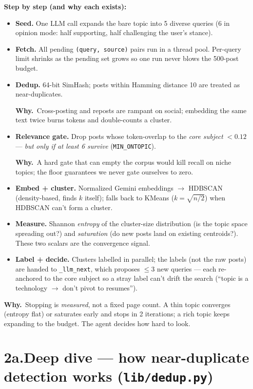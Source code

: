 \documentclass[11pt,a4paper]{article}
\newcommand{\why}[1]{%
  \par\vspace{2pt}%
  \noindent\colorbox{mist}{\begin{minipage}{\dimexpr\linewidth-2\fboxsep}%
  \textcolor{accent2}{\textbf{Why.}}~#1\end{minipage}}\par\vspace{3pt}}
\newcommand{\code}[1]{\texttt{\small #1}}
\begin{document}
\noindent\textbf{Step by step (and why each exists):}
\begin{itemize}
\item \textbf{Seed.} One LLM call expands the bare topic into 5 diverse queries
(6 in opinion mode: half supporting, half challenging the user's stance).
\item \textbf{Fetch.} All pending \code{(query, source)} pairs run in a thread
pool. Per-query limit shrinks as the pending set grows so one run never blows
the 500-post budget.
\item \textbf{Dedup.} 64-bit SimHash; posts within Hamming distance 10 are
treated as near-duplicates. \why{Cross-posting and reposts are rampant on
social; embedding the same text twice burns tokens and double-counts a cluster.}
\item \textbf{Relevance gate.} Drop posts whose token-overlap to the
\emph{core subject} $<0.12$ --- \emph{but only if at least 6 survive}
(\code{MIN\_ONTOPIC}). \why{A hard gate that can empty the corpus would kill
recall on niche topics; the floor guarantees we never gate ourselves to zero.}
\item \textbf{Embed + cluster.} Normalized Gemini embeddings $\rightarrow$
HDBSCAN (density-based, finds $k$ itself); falls back to KMeans
($k=\sqrt{n/2}$) when HDBSCAN can't form a cluster.
\item \textbf{Measure.} Shannon \emph{entropy} of the cluster-size distribution
(is the topic space spreading out?) and \emph{saturation} (do new posts land on
existing centroids?). These two scalars are the convergence signal.
\item \textbf{Label + decide.} Clusters labelled in parallel; the labels (not
the raw posts) are handed to \code{\_llm\_next}, which proposes $\le3$ new
queries --- each re-anchored to the core subject so a stray label can't drift
the search (``topic is a technology $\rightarrow$ don't pivot to resumes'').
\end{itemize}

\why{Stopping is \emph{measured}, not a fixed page count. A thin topic
converges (entropy flat) or saturates early and stops in 2 iterations; a rich
topic keeps expanding to the budget. The agent decides how hard to look.}

\section*{2a.\quad Deep dive --- how near-duplicate detection works (\code{lib/dedup.py})}
\end{document}
